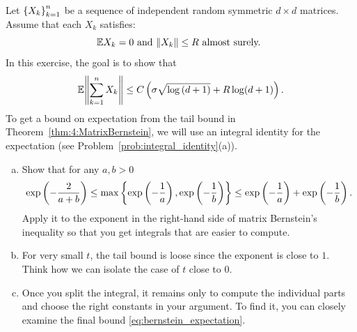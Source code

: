 \begin{myexercise}\label{prob:bernstein_expectation_bound}
    Let $\left\{ X_k \right\}_{k=1}^n$ be a sequence of independent random symmetric $d \times d$ matrices. Assume that each $X_k$ satisfies:
    \begin{equation*}
        \mathbb{E} X_k=0 \text { and } \|X_k\|\leq R \text { almost surely. }
    \end{equation*}
    In this exercise, the goal is to show that
    \begin{equation}\label{eq:bernstein_expectation}
        \mathbb{E} {\left\lVert{\sum_{k=1}^n X_k}\right\rVert} \le C \left(  \sigma \sqrt{\log{(d+1)}} + R\log(d+1) \right).
    \end{equation}
    To get a bound on expectation from the tail bound in Theorem~\ref{thm:4:MatrixBernstein}, we will use an integral identity for the expectation (see Problem~\ref{prob:integral_identity}(a)).
    \begin{enumerate}[(a)]
        \item Show that for any $a, b > 0$
        \begin{equation*}
            \exp\left( -\frac{2}{a+b} \right) \le \max\left\{ \exp\left( -\frac{1}{a} \right), \exp\left( -\frac{1}{b} \right) \right\} \le \exp\left( -\frac{1}{a} \right) + \exp\left( -\frac{1}{b} \right).
        \end{equation*}
        Apply it to the exponent in the right-hand side of matrix Bernstein's inequality so that you get integrals that are easier to compute. 
        \item For very small $t$, the tail bound is loose since the exponent is close to $1$. Think how we can isolate the case of $t$ close to $0$.
        \item Once you split the integral, it remains only to compute the individual parts and choose the right constants in your argument. To find it, you can closely examine the final bound \eqref{eq:bernstein_expectation}.  
    \end{enumerate}
\end{myexercise}


